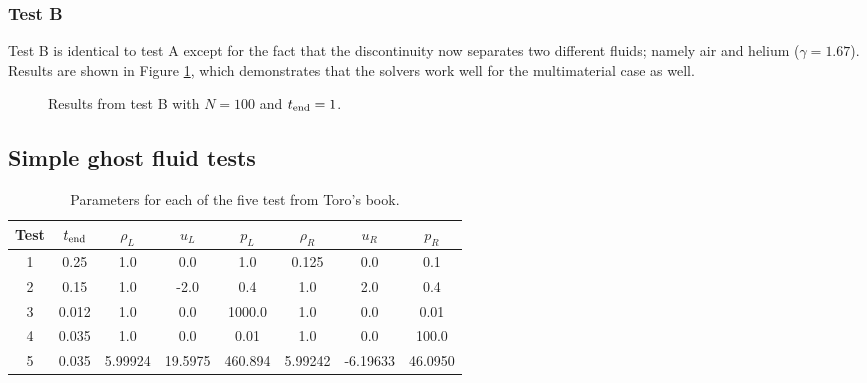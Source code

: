 \documentclass[final,3p,twocolumn]{elsarticle}
\begin{document}
\subsubsection{Test B}

Test B is identical to test A except for the fact that the discontinuity now
separates two different fluids; namely air and helium ($\gamma=1.67$).  Results
are shown in Figure \ref{fig:testB}, which demonstrates that the solvers work
well for the multimaterial case as well. 


\begin{figure}[htb]
    \centering
    \caption[caption]
    {
        Results from test B with $N=100$ and $t_{\rm end}=1$. 
    }
    \label{fig:testB}
\end{figure}

\subsection{Simple ghost fluid tests}
\label{subsec:toro}

\begin{table*}[htb]
    \centering
    \begin{tabular}{cccccccc}
        \hline 
        Test & $t_{\rm end}$ & $\rho_L$ & $u_L$ & $p_L$ & $\rho_R$ & $u_R$ & $p_R$ \\
        \hline 
        1 & 0.25 & 1.0 & 0.0 & 1.0 & 0.125 & 0.0 & 0.1 \\
        2 & 0.15 & 1.0 & -2.0 & 0.4 & 1.0 & 2.0 & 0.4 \\
        3 & 0.012 & 1.0 & 0.0 & 1000.0 & 1.0 & 0.0 & 0.01 \\
        4 & 0.035 & 1.0 & 0.0 & 0.01 & 1.0 & 0.0 & 100.0 \\
        5 & 0.035 & 5.99924 & 19.5975 & 460.894 & 5.99242 & -6.19633 & 46.0950 \\
        \hline
    \end{tabular}
    \caption{Parameters for each of the five test from Toro's book.}
    \label{tab:toro}
\end{table*}
\end{document}
